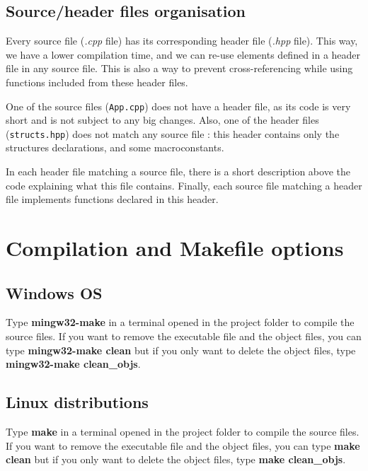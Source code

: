 \documentclass{article}
\begin{document}
\subsection{Source/header files organisation}

Every source file (\textit{.cpp} file) has its corresponding header file (\textit{.hpp} file). This way, we have a lower compilation time, and we can re-use elements defined in a header file in any source file. This is also a way to prevent cross-referencing while using functions included from these header files.\bigskip


One of the source files (\texttt{App.cpp}) does not have a header file, as its code is very short and is not subject to any big changes.
Also, one of the header files (\texttt{structs.hpp}) does not match any source file : this header contains only the structures declarations, and some macroconstants.\bigskip


In each header file matching a source file, there is a short description above the code explaining what this file contains. Finally, each source file matching a header file implements functions declared in this header.

\section{Compilation and Makefile options}

\subsection{Windows OS}

Type \textbf{mingw32-make} in a terminal opened in the project folder to compile the source files. If you want to remove the executable file and the object files, you can type \textbf{mingw32-make clean} but if you only want to delete the object files, type \textbf{mingw32-make clean\_objs}.

\subsection{Linux distributions}

Type \textbf{make} in a terminal opened in the project folder to compile the source files. If you want to remove the executable file and the object files, you can type \textbf{make clean} but if you only want to delete the object files, type \textbf{make clean\_objs}.
\end{document}
